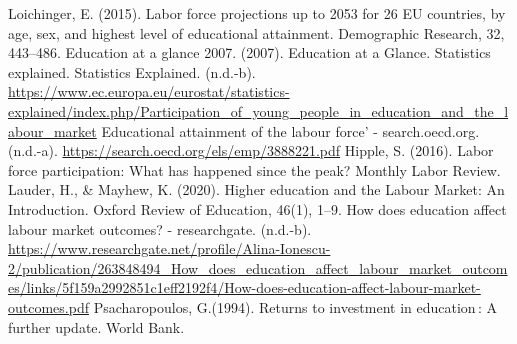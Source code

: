 \documentclass[
  12pt,
]{article}
\newlength{\cslhangindent}
\newlength{\cslentryspacingunit} %
\newenvironment{CSLReferences}[2] %
 {%
  \setlength{\parindent}{0pt}
  \ifodd #1
  \let\oldpar\par
  \def\par{\hangindent=\cslhangindent\oldpar}
  \fi
  \setlength{\parskip}{#2\cslentryspacingunit}
 }%
 {}
\begin{document}
Loichinger, E. (2015). Labor force projections up to 2053 for 26 EU countries, by age, sex, and highest level of educational attainment. Demographic Research, 32, 443--486.
Education at a glance 2007. (2007). Education at a Glance.
Statistics explained. Statistics Explained. (n.d.-b). \url{https://www.ec.europa.eu/eurostat/statistics-explained/index.php/Participation_of_young_people_in_education_and_the_labour_market}
Educational attainment of the labour force' - search.oecd.org. (n.d.-a). \url{https://search.oecd.org/els/emp/3888221.pdf}
Hipple, S. (2016). Labor force participation: What has happened since the peak? Monthly Labor Review.
Lauder, H., \& Mayhew, K. (2020). Higher education and the Labour Market: An Introduction. Oxford Review of Education, 46(1), 1--9.
How does education affect labour market outcomes? - researchgate. (n.d.-b). \url{https://www.researchgate.net/profile/Alina-Ionescu-2/publication/263848494_How_does_education_affect_labour_market_outcomes/links/5f159a2992851c1eff2192f4/How-does-education-affect-labour-market-outcomes.pdf}
Psacharopoulos, G.(1994). Returns to investment in education\,: A further update. World Bank.

\hypertarget{refs}{}
\begin{CSLReferences}{0}{0}
\end{CSLReferences}
\end{document}
